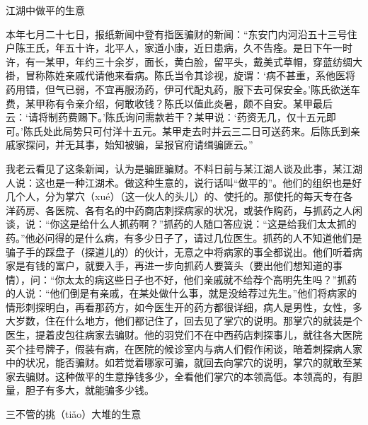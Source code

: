 \documentclass[12pt,UTF8]{ctexbook}
\begin{document}
江湖中做平的生意


本年七月二十七日，报纸新闻中登有指医骗财的新闻：“东安门内河沿五十三号住户陈王氏，年五十许，北平人，家道小康，近日患病，久不告痊。是日下午一时许，有一某甲，年约三十余岁，面长，黄白脸，留平头，戴美式草帽，穿蓝纺绸大褂，冒称陈姓亲戚代请他来看病。陈氏当令其诊视，旋谓：‘病不甚重，系他医将药用错，但气已弱，不宜再服汤药，伊可代配丸药，服下去可保安全。’陈氏欲送车费，某甲称有令亲介绍，何敢收钱？陈氏以值此炎暑，颇不自安。某甲最后云：‘请将制药费赐下。’陈氏询问需款若干？某甲说：‘药资无几，仅十五元即可。’陈氏处此局势只可付洋十五元。某甲走去时并云三二日可送药来。后陈氏到亲戚家探问，并无其事，始知被骗，呈报官府请缉骗匪云。”

我老云看见了这条新闻，认为是骗匪骗财。不料日前与某江湖人谈及此事，某江湖人说：这也是一种江湖术。做这种生意的，说行话叫“做平的”。他们的组织也是好几个人，分为掌穴（xué）（这一伙人的头儿）的、使托的。那使托的每天专在各洋药房、各医院、各有名的中药商店刺探病家的状况，或装作购药，与抓药之人闲谈，说：“你这是给什么人抓药啊？”抓药的人随口答应说：“这是给我们太太抓的药。”他必问得的是什么病，有多少日子了，请过几位医生。抓药的人不知道他们是骗子手的踩盘子（探道儿的）的伙计，无意之中将病家的事全都说出。他们听着病家是有钱的富户，就要入手，再进一步向抓药人要簧头（要出他们想知道的事情），问：“你太太的病这些日子也不好，他们亲戚就不给荐个高明先生吗？”抓药的人说：“他们倒是有亲戚，在某处做什么事，就是没给荐过先生。”他们将病家的情形刺探明白，再看那药方，如今医生开的药方都很详细，病人是男性，女性，多大岁数，住在什么地方，他们都记住了，回去见了掌穴的说明。那掌穴的就装是个医生，提着皮包往病家去骗财。他的羽党们不在中西药店刺探事儿，就往各大医院买个挂号牌子，假装有病，在医院的候诊室内与病人们假作闲谈，暗着刺探病人家中的状况，能否骗财。如若觉着哪家可骗，就回去向掌穴的说明，掌穴的就敢至某家去骗财。这种做平的生意挣钱多少，全看他们掌穴的本领高低。本领高的，有胆量，胆子有多大，就能骗多少钱。





三不管的挑（tiǎo）大堆的生意
\end{document}
